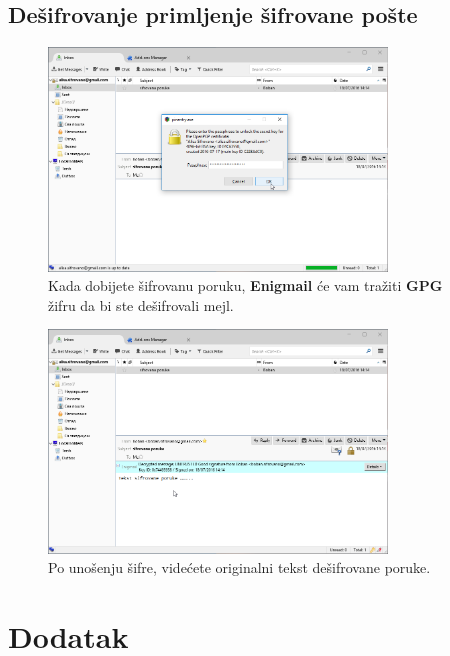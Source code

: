 \documentclass[a4paper,11pt]{article}
\begin{document}
\subsection{De\v{s}ifrovanje primljenje \v{s}ifrovane po\v{s}te}
\begin{figure}[!h]
	\begin{center}
		\includegraphics[width=9cm]{Inbox_decrypt1.png}
		\caption{Kada dobijete \v{s}ifrovanu poruku, \textbf{Enigmail} \'{c}e vam tra\v{z}iti \textbf{GPG} \v{z}ifru da bi ste de\v{s}ifrovali mejl.}
		\label{Email_provider_sees_encrypted_message}
	\end{center}
\end{figure}

\begin{figure}[!h]
	\begin{center}
		\includegraphics[width=9cm]{Inbox_decrypt2.png}
		\caption{Po uno\v{s}enju \v{s}ifre, vide\'{c}ete originalni tekst de\v{s}ifrovane poruke.}
		\label{Email_provider_sees_encrypted_message}
	\end{center}
\end{figure}
\newpage
\section{Dodatak}
\end{document}
